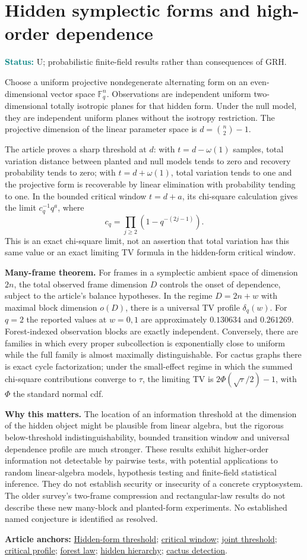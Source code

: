 \documentclass[11pt]{article}
\newcommand{\art}[3]{\href{https://github.com/VladimirReshetnikov/ProveIt/blob/3c4d27a69c98d09319a51e41a19fca05bb80a3e2/Analysis/GeneralizedRiemannHypothesis/Article/sections/#1.tex\#L#2}{#3}}
\newcommand{\status}[1]{\par\smallskip\noindent\textcolor{teal}{\textbf{Status:}} #1\par\smallskip}
\newcommand{\sources}[1]{\par\smallskip\noindent\textbf{Article anchors:} #1\par}
\newcommand{\F}{\mathbb F}
\begin{document}
\section{Hidden symplectic forms and high-order dependence}
\status{U; probabilistic finite-field results rather than consequences of GRH.}
Choose a uniform projective nondegenerate alternating form on an even-dimensional vector space $\F_q^n$. Observations are independent uniform two-dimensional totally isotropic planes for that hidden form. Under the null model, they are independent uniform planes without the isotropy restriction. The projective dimension of the linear parameter space is $d=\binom n2-1$.

The article proves a sharp threshold at $d$: with $t=d-\omega(1)$ samples, total variation distance between planted and null models tends to zero and recovery probability tends to zero; with $t=d+\omega(1)$, total variation tends to one and the projective form is recoverable by linear elimination with probability tending to one. In the bounded critical window $t=d+a$, its chi-square calculation gives the limit $c_q^{-1}q^a$, where
\[
 c_q=\prod_{j\ge2}(1-q^{-(2j-1)}).
\]
This is an exact chi-square limit, not an assertion that total variation has this same value or an exact limiting TV formula in the hidden-form critical window.

\textbf{Many-frame theorem.} For frames in a symplectic ambient space of dimension $2n$, the total observed frame dimension $D$ controls the onset of dependence, subject to the article's balance hypotheses. In the regime $D=2n+w$ with maximal block dimension $o(D)$, there is a universal TV profile $\delta_q(w)$. For $q=2$ the reported values at $w=0,1$ are approximately $0.130634$ and $0.261269$. Forest-indexed observation blocks are exactly independent. Conversely, there are families in which every proper subcollection is exponentially close to uniform while the full family is almost maximally distinguishable. For cactus graphs there is exact cycle factorization; under the small-effect regime in which the summed chi-square contributions converge to $\tau$, the limiting TV is $2\Phi(\sqrt\tau/2)-1$, with $\Phi$ the standard normal cdf.

\textbf{Why this matters.} The location of an information threshold at the dimension of the hidden object might be plausible from linear algebra, but the rigorous below-threshold indistinguishability, bounded transition window and universal dependence profile are much stronger. These results exhibit higher-order information not detectable by pairwise tests, with potential applications to random linear-algebra models, hypothesis testing and finite-field statistical inference. They do not establish security or insecurity of a concrete cryptosystem. The older survey's two-frame compression and rectangular-law results do not describe these new many-block and planted-form experiments. No established named conjecture is identified as resolved.
\sources{\art{spn}{2139}{Hidden-form threshold}; \art{spn}{2150}{critical window}; \art{spn}{3372}{joint threshold}; \art{spn}{3483}{critical profile}; \art{spn}{3660}{forest law}; \art{spn}{3676}{hidden hierarchy}; \art{spn}{3909}{cactus detection}.}
\clearpage
\end{document}
